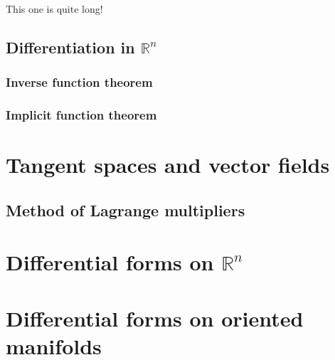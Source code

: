 \documentclass[letter-paper]{tufte-book}
\newenvironment{proof}[1][Proof]{\begin{trivlist}
\item[\hskip \labelsep {\bfseries #1}]}{\end{trivlist}}
\begin{document}
\begin{proof}
  This one is quite long! 
\end{proof}


\section{Differentiation in $\mathbb{R}^n$}


\subsection{Inverse function theorem}


\subsection{Implicit function theorem}


\chapter{Tangent spaces and vector fields}


\section{Method of Lagrange multipliers}


\chapter{Differential forms on $\mathbb{R}^n$}


\chapter{Differential forms on oriented manifolds}
\end{document}
